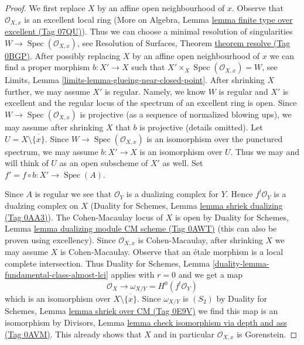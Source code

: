 \documentclass{amsart}
\theoremstyle{plain}
\theoremstyle{definition}
\theoremstyle{remark}
\numberwithin{equation}{subsection}
\def\Spec{\mathop{\mathrm{Spec}}}
\begin{document}
\begin{proof}
We first replace $X$ by an affine open neighbourhood of $x$.
Observe that $\mathcal{O}_{X, x}$ is an excellent local ring
(More on Algebra, Lemma \href{https://stacks.math.columbia.edu/tag/07QU}{lemma finite type over excellent (Tag 07QU)}).
Thus we can choose a minimal resolution of singularities
$W \to \Spec(\mathcal{O}_{X, x})$, see
Resolution of Surfaces, Theorem \href{https://stacks.math.columbia.edu/tag/0BGP}{theorem resolve (Tag 0BGP)}.
After possibly replacing $X$ by an affine open neighbourhood of $x$
we can find a proper morphism $b : X' \to X$ such that
$X' \times_X \Spec(\mathcal{O}_{X, x}) = W$, see
Limits, Lemma \ref{limits-lemma-glueing-near-closed-point}.
After shrinking $X$ further, we may assume $X'$ is regular.
Namely, we know $W$ is regular and $X'$ is excellent
and the regular locus of the spectrum of an excellent ring is open.
Since $W \to \Spec(\mathcal{O}_{X, x})$ is projective
(as a sequence of normalized blowing ups), we may assume
after shrinking $X$ that $b$ is projective (details omitted).
Let $U = X \setminus \overline{\{x\}}$.
Since $W \to \Spec(\mathcal{O}_{X, x})$ is an isomorphism over the
punctured spectrum, we may assume $b : X' \to X$ is an isomorphism over $U$.
Thus we may and will think of $U$ as an open subscheme of $X'$ as well.
Set $f' = f \circ b : X' \to \Spec(A)$.

\medskip\noindent
Since $A$ is regular we see that $\mathcal{O}_Y$ is a dualizing complex for $Y$.
Hence $f^!\mathcal{O}_Y$ is a dualzing complex on $X$
(Duality for Schemes, Lemma \href{https://stacks.math.columbia.edu/tag/0AA3}{lemma shriek dualizing (Tag 0AA3)}).
The Cohen-Macaulay locus of $X$ is open by
Duality for Schemes, Lemma \href{https://stacks.math.columbia.edu/tag/0AWT}{lemma dualizing module CM scheme (Tag 0AWT)}
(this can also be proven using excellency).
Since $\mathcal{O}_{X, x}$ is Cohen-Macaulay, after shrinking
$X$ we may assume $X$ is Cohen-Macaulay.
Observe that an \'etale morphism is a local complete intersection.
Thus
Duality for Schemes, Lemma \ref{duality-lemma-fundamental-class-almost-lci}
applies with $r = 0$ and we get a map
$$
\mathcal{O}_X \longrightarrow \omega_{X/Y} = H^0(f^!\mathcal{O}_Y)
$$
which is an isomorphism over $X \setminus \overline{\{x\}}$.
Since $\omega_{X/Y}$ is $(S_2)$ by
Duality for Schemes, Lemma \href{https://stacks.math.columbia.edu/tag/0E9V}{lemma shriek over CM (Tag 0E9V)}
we find this map is an isomorphism by
Divisors, Lemma \href{https://stacks.math.columbia.edu/tag/0AVM}{lemma check isomorphism via depth and ass (Tag 0AVM)}.
This already shows that $X$ and in particular $\mathcal{O}_{X, x}$ is
Gorenstein.


\end{proof}
\end{document}
